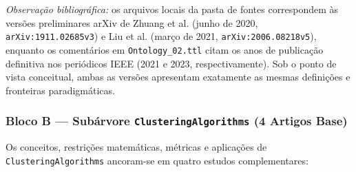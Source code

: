 \documentclass[11pt,a4paper]{article}
\newcommand{\onto}[1]{\texttt{#1}}
\begin{document}
\emph{Observação bibliográfica:} os arquivos locais da pasta de fontes correspondem às versões preliminares arXiv de Zhuang et al. (junho de 2020, \texttt{arXiv:1911.02685v3}) e Liu et al. (março de 2021, \texttt{arXiv:2006.08218v5}), enquanto os comentários em \texttt{Ontology\_02.ttl} citam os anos de publicação definitiva nos periódicos IEEE (2021 e 2023, respectivamente). Sob o ponto de vista conceitual, ambas as versões apresentam exatamente as mesmas definições e fronteiras paradigmáticas.

\subsubsection{Bloco B --- Subárvore \onto{ClusteringAlgorithms} (4 Artigos Base)}

Os conceitos, restrições matemáticas, métricas e aplicações de \onto{ClusteringAlgorithms} ancoram-se em quatro estudos complementares:
\end{document}
